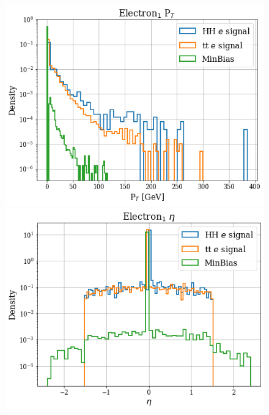 \documentclass[../main.tex]{subfiles}
\begin{document}
\begin{figure}[!ht] 
  \begin{minipage}[b]{0.33\linewidth}
    \centering
    \includegraphics[width=1\linewidth]{Chapters/Plots/Hist_1ele_electron1_Et.png}
  \end{minipage}%
  \begin{minipage}[b]{0.33\linewidth}
    \centering
    \includegraphics[width=1\linewidth]{Chapters/Plots/Hist_1ele_electron1_Eta.png}
  \end{minipage} %
  \begin{minipage}[b]{0.33\linewidth}

\end{minipage}
\end{figure}
\end{document}
